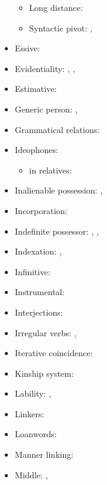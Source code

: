 \documentclass[oldfontcommands,oneside,a4paper,11pt]{article}
\begin{document}
\begin{itemize}
\begin{itemize}
\item Long distance: \citet[278]{jacques14linking}
\item Syntactic pivot:   \citet[208]{jacques12demotion}, \citet[256-257]{jacques16complementation}
\end{itemize}
\item Essive: \citet[225]{jacques16complementation}
\item Evidentiality: \citet[380-390]{jacques04these}, \citet{jacques08}, \citet[617-620]{jacques17sketch}
\item Estimative: \citet{jacques13tropative}
\item Generic person:   \citet[204-8]{jacques12demotion}, \citet{jacques17generic}
\item Grammatical relations: \citet{jacques16relatives}
\item Ideophones: \citet{japhug14ideophones}
\begin{itemize}
\item in relatives: \citet[275]{japhug14ideophones}
\end{itemize}
\item Inalienable possession: \citet[4]{jacques14antipassive}, \citet{jacques17generic}
\item Incorporation: \citet{jacques12incorp}
\item Indefinite possessor: \citet[1212]{jacques12incorp}, \citet[4]{jacques14antipassive}, \citet{jacques17generic}
\item Indexation: \citet{jacques10inverse}, \citet[85]{jacques12agreement}
\item Infinitive: \citet[227-228]{jacques16complementation}
\item Instrumental: \citet{jacques16comparative}
\item Interjections: \citet[283]{japhug14ideophones}
\item Irregular verbs: \citet[91]{jacques12agreement}, \citet[1215]{jacques12incorp}
\item Iterative coincidence: \citet[296]{jacques14linking}
\item Kinship system: \citet{jacques11kinship}
\item Lability: \citet[216-9]{jacques12demotion}, \citet[626]{jacques17sketch}
\item Linkers:  \citet[276-7]{jacques14linking}
\item Loanwords: \citet[83-199]{jacques04these}
\item Manner linking:  \citet[320-5]{jacques14linking}
\item Middle:  \citet{jacques12demotion}, \citet{jacques15spontaneous}

\end{itemize}
\end{document}
